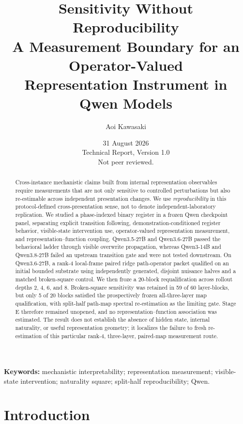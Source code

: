 \documentclass[10pt,a4paper]{article}
\title{\textbf{Sensitivity Without Reproducibility}\\[5pt]
\large A Measurement Boundary for an Operator-Valued\\
Representation Instrument in Qwen Models}
\author{Aoi Kawasaki}
\date{31 August 2026\\[2pt]
\small Technical Report, Version 1.0\\[-1pt]
\small Not peer reviewed.}
\begin{document}
\maketitle

\begin{abstract}
Cross-instance mechanistic claims built from internal representation observables require measurements that are not only sensitive to controlled perturbations but also re-estimable across independent presentation changes. We use \emph{reproducibility} in this protocol-defined cross-presentation sense, not to denote independent-laboratory replication. We studied a phase-indexed binary register in a frozen Qwen checkpoint panel, separating explicit transition following, demonstration-conditioned register behavior, visible-state intervention use, operator-valued representation measurement, and representation--function coupling. Qwen3.5-27B and Qwen3.6-27B passed the behavioral ladder through visible overwrite propagation, whereas Qwen3-14B and Qwen3.8-27B failed an upstream transition gate and were not tested downstream. On Qwen3.6-27B, a rank-4 local-frame paired ridge path-operator packet qualified on an initial bounded substrate using independently generated, disjoint nuisance halves and a matched broken-square control. We then froze a 20-block requalification across rollout depths 2, 4, 6, and 8. Broken-square sensitivity was retained in 59 of 60 layer-blocks, but only 5 of 20 blocks satisfied the prospectively frozen all-three-layer map qualification, with split-half path-map spectral re-estimation as the limiting gate. Stage E therefore remained unopened, and no representation--function association was estimated. The result does not establish the absence of hidden state, internal naturality, or useful representation geometry; it localizes the failure to fresh re-estimation of this particular rank-4, three-layer, paired-map measurement route.
\end{abstract}

\noindent\textbf{Keywords:} mechanistic interpretability; representation measurement; visible-state intervention; naturality square; split-half reproducibility; Qwen.

\section{Introduction}
\label{sec:introduction}
\end{document}
